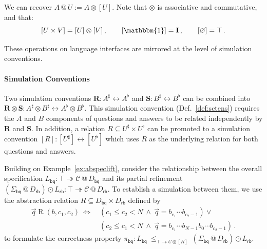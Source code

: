 \documentclass[acmsmall,screen,review,anonymous]{acmart}
\newcommand{\kw}[1]{\ensuremath{ \mathsf{#1} }}
\begin{document}
We can recover
$A \mathbin@ U := A \otimes [U]$.
Note that $\otimes$ is %
associative and commutative,
and that:
\[
  [U \times V] = [U] \otimes [V]
  \,,
  \qquad
  [\mathbbm{1}] = \mathbf{I}
  \,,
  \qquad
  [\varnothing] = \top
  \,.
\]

These operations on language interfaces
are mirrored at the level of simulation conventions.

\paragraph{Simulation Conventions} %

Two simulation conventions
$\mathbf{R} : A^\sharp \leftrightarrow A^\flat$ and
$\mathbf{S} : B^\sharp \leftrightarrow B^\flat$
can be combined into %
$
  \mathbf{R} \otimes \mathbf{S} :
  A^\sharp \otimes B^\sharp \leftrightarrow
  A^\flat \otimes B^\flat
$.
This simulation convention
(Def.~\ref{def:sctens})
requires the $A$ and $B$ components
of questions and answers
to be related independently by $\mathbf{R}$ and $\mathbf{S}$.
In addition,
a relation $R \subseteq U^\sharp \times U^\flat$
can be promoted to a simulation convention
$
  [R] : [U^\sharp] \leftrightarrow [U^\flat]
$
which uses $R$ as the underlying relation for both
questions and answers.


\begin{example}[Correctness of \kw{bq.c}] \label{ex:bqcorrect} %
Building on Example~\ref{ex:abspeclift},
consider the relationship between
the overall specification $
  L_\kw{bq} :
    \top \twoheadrightarrow \mathcal{C} \mathbin@ D_\kw{bq}
$
and its partial refinement
$
  (\Sigma_\kw{bq} \mathbin@ D_\kw{rb}) \odot L_\kw{rb} :
    \top \twoheadrightarrow \mathcal{C} \mathbin@ D_\kw{rb}
$.
To establish a simulation between them,
we use the abstraction relation
$R \subseteq D_\kw{bq} \times D_\kw{rb}$
defined by
\begin{align*}
  \vec{q} \mathrel{R} (b, c_1, c_2) \:\Leftrightarrow\: {}
    & (c_1 \le c_2 < N \:\wedge\: \vec{q} = b_{c_1} \cdots b_{c_2-1}) \vee {} \\
    & (c_2 \le c_1 < N \:\wedge\: \vec{q} = b_{c_1} \cdots b_{N-1} b_0 \cdots b_{c_2 - 1})
  \,.
\end{align*}
to formulate the correctness property
$
  \pi_\kw{bq} :
  L_\kw{bq}
  \:\le_{\top \twoheadrightarrow \mathcal{C} \otimes [R]}\:
  (\Sigma_\kw{bq} \mathbin@ D_\kw{rb}) \odot
  L_\kw{rb}
$.
\end{example}
\end{document}
